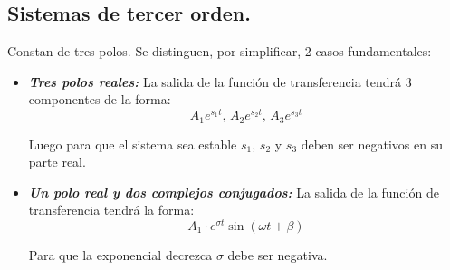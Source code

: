 		\subsection{Sistemas de tercer orden.}
			Constan de tres polos. Se distinguen, por simplificar, 2 casos fundamentales:
			\begin{itemize}
				\item \textbf{\textit{Tres polos reales:}}
				 	La salida de la función de transferencia tendrá 3 componentes de la forma:
				 	\[A_1 e^{s_1 t},\,A_2 e^{s_2 t},\,A_3 e^{s_3 t}\]
				 	
				 	Luego para que el sistema sea estable $s_1$, $s_2$ y $s_3$ deben ser negativos en su parte real.
				 	
				 \item \textbf{\textit{Un polo real y dos complejos conjugados:}}
				 	La salida de la función de transferencia tendrá la forma:
				 	\[A_1\cdot e^{\sigma t} \sin (\omega t + \beta)\]
				 	
				 	Para que la exponencial decrezca $\sigma$ debe ser negativa.
			\end{itemize}
	
